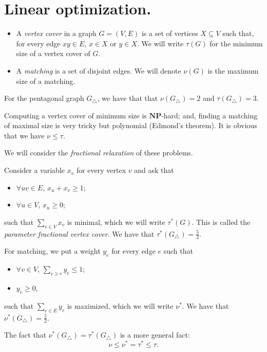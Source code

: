 \documentclass[./main]{subfiles}
\begin{document}
  \chapter{Linear optimization.}

  \begin{exm}
    \begin{itemize}
      \item A \textit{vertex cover} in a graph $G = (V, E)$ is a set of vertices  $X \subseteq V$ such that, for every edge $xy \in E$, $x \in X$ or $y \in X$. We will write $\tau(G)$ for the minimum size of a vertex cover of  $G$.
      \item A \textit{matching} is a set of disjoint edges.
        We will denote $\nu(G)$ is the maximum size of a matching.
    \end{itemize}

    \let\pentagon\triangle

    For the pentagonal graph $G_\pentagon$, we have that that $\nu(G_\pentagon) = 2$ and  $\tau(G_\pentagon) = 3$.

    Computing a vertex cover of minimum size is $\mathbf{NP}$-hard; and, finding a matching of maximal size is very tricky but polynomial (Edmond's theorem).
    It is obvious that we have $\nu \le \tau$.

    We will consider the \textit{fractional relaxation} of these problems.

    Consider a variable $x_v$ for every vertex $v$ and ask that 
    \begin{itemize}
      \item $\forall uv \in E$, $x_u + x_v \ge 1$;
      \item $\forall u \in V$, $x_u \ge 0$;
    \end{itemize}
    such that $\sum_{v \in V} x_v$ is minimal, which we will write $\tau^*(G)$.
    This is called the \textit{parameter fractional vertex cover}.
    We have that $\tau^*(G_\pentagon) = \frac{5}{2}$.

    For matching, we put a weight $y_e$ for every edge $e$ such that
    \begin{itemize}
      \item $\forall v \in V$, $ \sum_{e \ni v} y_e \le 1$;
      \item $y_e \ge 0$,
    \end{itemize}
    such that $\sum_{e \in E} y_e$ is maximized, which we will write $\nu^*$.
    We have that $\nu^*(G_\pentagon) = \frac{5}{2}$.

    The fact that $\nu^*(G_\pentagon) = \tau^*(G_\pentagon)$ is a more general fact:
     \[
    \nu \le \nu^* = \tau^* \le \tau
    .\] 
  \end{exm}
\end{document}
